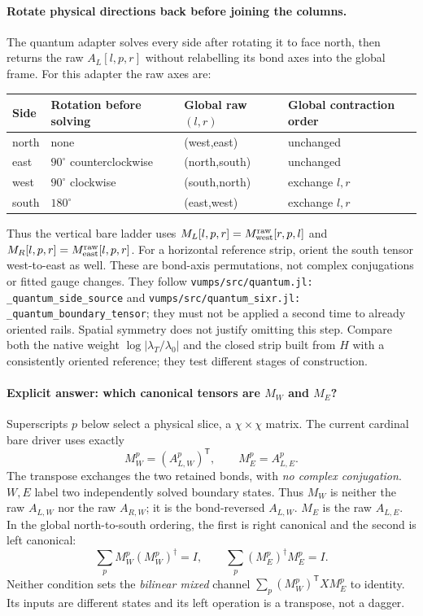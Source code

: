 \documentclass[11pt]{article}
\newcommand{\code}[1]{{\small\nolinkurl{#1}}}
\begin{document}
\paragraph{Rotate physical directions back before joining the columns.}
The quantum adapter solves every side after rotating it to face north, then
returns the raw $A_L[l,p,r]$ without relabelling its bond axes into the global
frame. For this adapter the raw axes are:
\begin{center}
\begin{tabular}{llll}
\toprule
Side & Rotation before solving & Global raw $(l,r)$ & Global contraction order\\
\midrule
north & none & (west,east) & unchanged\\
east & $90^\circ$ counterclockwise & (north,south) & unchanged\\
west & $90^\circ$ clockwise & (south,north) & exchange $l,r$\\
south & $180^\circ$ & (east,west) & exchange $l,r$\\
\bottomrule
\end{tabular}
\end{center}
Thus the vertical bare ladder uses
$M_L[l,p,r]=M_{\rm west}^{\rm raw}[r,p,l]$ and
$M_R[l,p,r]=M_{\rm east}^{\rm raw}[l,p,r]$.
For a horizontal reference strip, orient the south tensor west-to-east as
well. These are bond-axis permutations, not complex conjugations or fitted
gauge changes. They follow
\code{vumps/src/quantum.jl: \_quantum\_side\_source} and
\code{vumps/src/quantum\_sixr.jl: \_quantum\_boundary\_tensor}; they must not be
applied a second time to already oriented rails. Spatial symmetry does not
justify omitting this step. Compare both the native weight
$\log|\lambda_T/\lambda_0|$ and the closed strip built from $H$ with a
consistently oriented reference; they test different stages of construction.

\ifdetailed
\paragraph{Explicit answer: which canonical tensors are $M_W$ and $M_E$?}
Superscripts $p$ below select a physical slice, a $\chi\times\chi$ matrix.
The current cardinal bare driver uses exactly
\begin{equation}\label{eq:actual-we}
 \boxed{M_W^p=(A_{L,W}^p)^{\mathsf T},\qquad M_E^p=A_{L,E}^p.}
\end{equation}
The transpose exchanges the two retained bonds, with \emph{no complex
conjugation}. $W,E$ label two independently solved boundary states. Thus
$M_W$ is neither the raw $A_{L,W}$ nor the raw $A_{R,W}$; it is the
bond-reversed $A_{L,W}$. $M_E$ is the raw $A_{L,E}$. In the global
north-to-south ordering, the first is right canonical and the second is
left canonical:
\begin{equation}
 \sum_p M_W^p(M_W^p)^\dagger=I,\qquad
 \sum_p(M_E^p)^\dagger M_E^p=I.
\end{equation}
Neither condition sets the \emph{bilinear mixed} channel
$\sum_p(M_W^p)^{\mathsf T}X M_E^p$ to identity. Its inputs are different
states and its left operation is a transpose, not a dagger.
\end{document}
